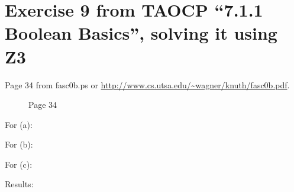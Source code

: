 \section{Exercise 9 from TAOCP ``7.1.1 Boolean Basics'', solving it using Z3}

Page 34 from fasc0b.ps or \url{http://www.cs.utsa.edu/~wagner/knuth/fasc0b.pdf}.

\begin{figure}[H]
\centering
{}
\caption{Page 34}
\end{figure}

For (a):



For (b):



For (c):



Results:



